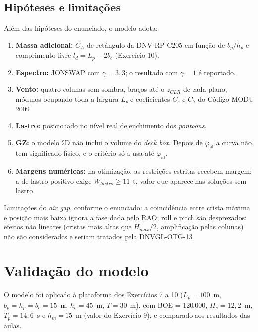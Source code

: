 \documentclass[11pt,a4paper]{article}
\newcommand{\phial}{\varphi_{\mathrm{al}}}
\begin{document}
\subsection{Hipóteses e limitações}

Além das hipóteses do enunciado, o modelo adota:
\begin{enumerate}
\item \textbf{Massa adicional:} $C_A$ de retângulo da DNV-RP-C205 em função de $b_p/h_p$ e
comprimento livre $l_d = L_p - 2b_c$ (Exercício 10).
\item \textbf{Espectro:} JONSWAP com $\gamma = 3{,}3$; o resultado com $\gamma = 1$ é reportado.
\item \textbf{Vento:} quatro colunas sem sombra, braços até o $z_{CLR}$ de cada plano, módulos
ocupando toda a largura $L_p$ e coeficientes $C_s$ e $C_h$ do Código MODU 2009.
\item \textbf{Lastro:} posicionado no nível real de enchimento dos \emph{pontoons}.
\item \textbf{GZ:} o modelo 2D não inclui o volume do \emph{deck box}. Depois de $\phial$ a
curva não tem significado físico, e o critério só a usa até $\phial$.
\item \textbf{Margens numéricas:} na otimização, as restrições estritas recebem margem; a de
lastro positivo exige $W_{lastro} \ge 11$~t, valor que aparece nas soluções sem lastro.
\end{enumerate}
Limitações do \emph{air gap}, conforme o enunciado: a coincidência entre crista máxima e posição
mais baixa ignora a fase dada pelo RAO; roll e pitch são desprezados; efeitos não lineares
(cristas mais altas que $H_{max}/2$, amplificação pelas colunas) não são considerados e seriam
tratados pela DNVGL-OTG-13.

\section{Validação do modelo}\label{sec:validacao}

O modelo foi aplicado à plataforma dos Exercícios 7 a 10 ($L_p = 100$~m,
$b_p = h_p = b_c = 15$~m, $h_c = 45$~m, $T = 30$~m), com BOE = 120.000, $H_s = 12{,}2$~m,
$T_p = 14{,}6$~s e $h_m = 15$~m (valor do Exercício 9), e comparado aos resultados das aulas.
\end{document}
